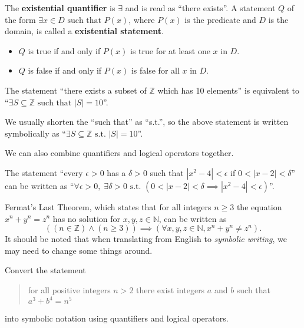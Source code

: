 \begin{definition}
    The \textbf{existential quantifier} is $\exists$ and is read as ``there exists''. A statement $Q$ of the form $\exists x \in D \textrm{ such that } P(x)$, where $P(x)$ is the predicate and $D$ is the domain, is called a \textbf{existential statement}.
    \begin{itemize}
        \item $Q$ is true if and only if $P(x)$ is true for at least one $x$ in $D$.
        \item $Q$ is false if and only if $P(x)$ is false for all $x$ in $D$.
    \end{itemize}
\end{definition}
\begin{example}
    The statement ``there exists a subset of $\mathbb{Z}$ which has 10 elements'' is equivalent to ``$\exists S \subseteq \mathbb{Z} \text{ such that } |S| = 10$''.
\end{example}
\begin{remark}
    We usually shorten the ``such that'' as ``s.t.'', so the above statement is written symbolically as ``$\exists S \subseteq \mathbb{Z} \text{ s.t. } |S| = 10$''.
\end{remark}

We can also combine quantifiers and logical operators together.
\begin{example}
    The statement ``every $\epsilon > 0$ has a $\delta > 0$ such that $|x^2 - 4| < \epsilon$ if $0 < |x - 2| < \delta$'' can be written as ``$\forall \epsilon > 0,\;\exists \delta > 0 \text{ s.t. } (0 < |x - 2| < \delta \implies |x^2 - 4| < \epsilon)$''.
\end{example}
\begin{example}
    Fermat's Last Theorem, which states that for all integers $n\geq 3$ the equation $x^n + y^n = z^n$ has no solution for $x, y, z \in \mathbb{N}$, can be written as
    \[
        \left((n \in \mathbb{Z}) \land (n \geq 3)\right) \implies \left(\forall x, y, z \in \mathbb{N}, x^n + y^n \neq z^n\right).
    \]
    It should be noted that when translating from English to \textit{symbolic writing}, we may need to change some things around.
\end{example}

\begin{exercise}
    Convert the statement
    \begin{quote}
        for all positive integers $n > 2$ there exist integers $a$ and $b$ such that $a^3 + b^4 = n^5$
    \end{quote}
    into symbolic notation using quantifiers and logical operators.
\end{exercise}

